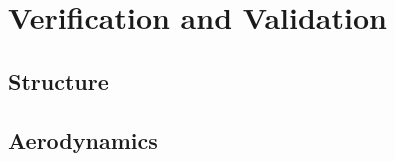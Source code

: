 \section{Verification and Validation}

\subsection{Structure} \label{sec:VandVstruc}


\subsection{Aerodynamics} \label{sec:VandVaero}


